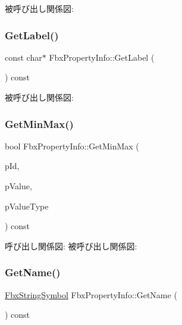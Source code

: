 被呼び出し関係図\+:
\mbox{\label{class_fbx_property_info_a94e6d246bc911d53eb56b855bff47055}} 
\subsubsection{\texorpdfstring{Get\+Label()}{GetLabel()}}
{\footnotesize\ttfamily const char$\ast$ Fbx\+Property\+Info\+::\+Get\+Label (\begin{DoxyParamCaption}{ }\end{DoxyParamCaption}) const}

被呼び出し関係図\+:
\mbox{\label{class_fbx_property_info_aa21fd9cc302856625f4a993a781b208f}} 
\subsubsection{\texorpdfstring{Get\+Min\+Max()}{GetMinMax()}}
{\footnotesize\ttfamily bool Fbx\+Property\+Info\+::\+Get\+Min\+Max (\begin{DoxyParamCaption}\item[{\hyperlink{class_fbx_property_info_a83069f079a29bde133f2e9324de5af43}{E\+Value\+Index}}]{p\+Id,  }\item[{void $\ast$}]{p\+Value,  }\item[{\hyperlink{fbxpropertytypes_8h_a73913a5ddfb20e57c6f25e9e6784bd92}{E\+Fbx\+Type}}]{p\+Value\+Type }\end{DoxyParamCaption}) const}

呼び出し関係図\+:
被呼び出し関係図\+:
\mbox{\label{class_fbx_property_info_af06f1b9f0f8505414e1cf85cc87cfb2a}} 
\subsubsection{\texorpdfstring{Get\+Name()}{GetName()}}
{\footnotesize\ttfamily \hyperlink{class_fbx_string_symbol}{Fbx\+String\+Symbol} Fbx\+Property\+Info\+::\+Get\+Name (\begin{DoxyParamCaption}{ }\end{DoxyParamCaption}) const}

